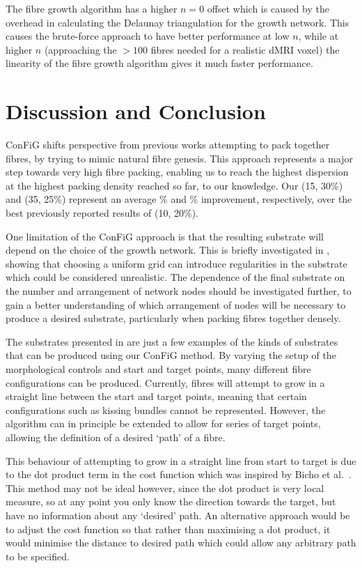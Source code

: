 The fibre growth algorithm has a higher $n=0$ offset which is caused by the overhead in calculating the Delaunay triangulation for the growth network.
This causes the brute-force approach to have better performance at low $n$, while at higher $n$ (approaching the $>100$ fibres needed for a realistic dMRI voxel) the linearity of the fibre growth algorithm gives it much faster performance. 



\section{Discussion and Conclusion}
\label{sec:config_discussion}
ConFiG shifts perspective from previous works attempting to pack together fibres, by trying to mimic natural fibre genesis. 
This approach represents a major step towards very high fibre packing, enabling us to reach the highest dispersion at the highest packing density reached so far, to our knowledge. Our (15\degree, 30\%) and (35\degree, 25\%) represent an average \% and \% improvement, respectively, over the best previously reported results of (10\degree, 20\%)\cite{Ginsburger2018}.

One limitation of the ConFiG approach is that the resulting substrate will depend on the choice of the growth network.
This is briefly investigated in , showing that choosing a uniform grid can introduce regularities in the substrate which could be considered unrealistic.
The dependence of the final substrate on the number and arrangement of network nodes should be investigated further, to gain a better understanding of which arrangement of nodes will be necessary to produce a desired substrate, particularly when packing fibres together densely.  


The substrates presented in  are just a few examples of the kinds of substrates that can be produced using our ConFiG method.
By varying the setup of the morphological controls and start and target points, many different fibre configurations can be produced.
Currently, fibres will attempt to grow in a straight line between the start and target points, meaning that certain configurations such as kissing bundles cannot be represented.
However, the algorithm can in principle be extended to allow for series of target points, allowing the definition of a desired `path' of a fibre.

This behaviour of attempting to grow in a straight line from start to target is due to the dot product term in the cost function which was inspired by Bicho et al.\ \cite{Bicho2012}.
This method may not be ideal however, since the dot product is very local measure, so at any point you only know the direction towards the target, but have no information about any `desired' path. 
An alternative approach would be to adjust the cost function so that rather than maximising a dot product, it would minimise the distance to desired path which could allow any arbitrary path to be specified.

